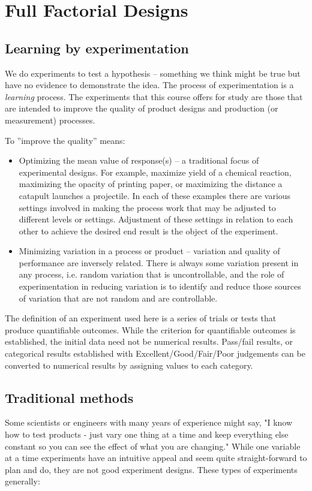 \chapter{Full Factorial Designs}

\section{Learning by experimentation}
We do experiments to test a hypothesis -- something we think might be true but have no evidence to demonstrate the idea.  The process of experimentation is a \textit{learning} process.  The experiments that this course offers for study are those that are intended to improve the quality of product designs and production (or measurement) processes.

To ''improve the quality'' means:

\begin{itemize}
\item Optimizing the mean value of response(s) -- a traditional focus of experimental designs.  For example, maximize yield of a chemical reaction, maximizing the opacity of printing paper, or maximizing the distance a catapult launches a projectile. In each of these examples there are various settings involved in making the process work that may be adjusted to different levels or settings.  Adjustment of these settings in relation to each other to achieve the desired end result is the object of the experiment.

\item Minimizing variation in a process or product -- variation and quality of performance are inversely related. There is always some variation present in any process, i.e. random variation that is uncontrollable, and the role of experimentation in reducing variation is to identify and reduce those sources of variation that are not random and are controllable.
\end{itemize}

The definition of an experiment used here is a series of trials or tests that produce quantifiable outcomes. While the criterion for quantifiable outcomes is established, the initial data need not be numerical results. Pass/fail results, or categorical results established with Excellent/Good/Fair/Poor judgements can be converted to numerical results by assigning values to each category.

\section{Traditional methods}
Some scientists or engineers with many years of experience might say, "I know how to test products - just vary one thing at a time and keep everything else constant so you can see the effect of what you are changing."  While one variable at a time experiments have an intuitive appeal and seem quite straight-forward to plan and do, they are not good experiment designs.  These types of experiments generally:

